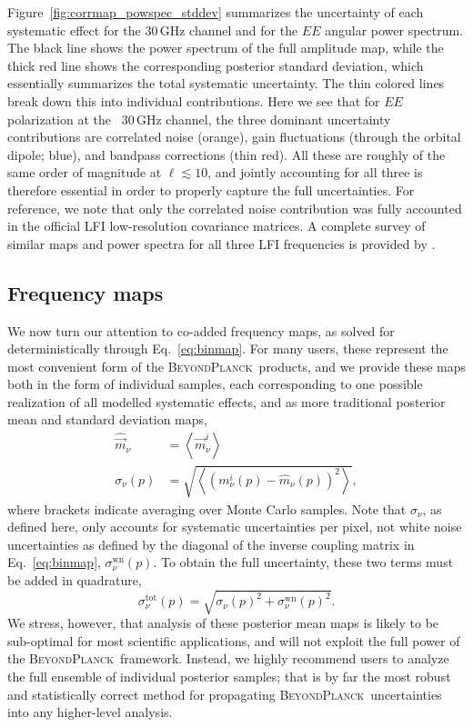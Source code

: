 \documentclass[onecolumn]{aa}
\newcommand{\m}[0]{\vec{m}}
\newcommand{\BP}{\textsc{BeyondPlanck}}
\begin{document}
Figure~\ref{fig:corrmap_powspec_stddev} summarizes the uncertainty of
each systematic effect for the 30\,GHz channel and for the $EE$
angular power spectrum. The black line shows the power spectrum of the
full amplitude map, while the thick red line shows the corresponding
posterior standard deviation, which essentially summarizes the total
systematic uncertainty. The thin colored lines break down this into
individual contributions. Here we see that for $EE$ polarization at
the \Planck\ 30\,GHz channel, the three dominant uncertainty
contributions are correlated noise (orange), gain fluctuations
(through the orbital dipole; blue), and bandpass corrections (thin
red). All these are roughly of the same order of magnitude at
$\ell\lesssim10$, and jointly accounting for all three is therefore
essential in order to properly capture the full uncertainties. For
reference, we note that only the correlated noise contribution was
fully accounted in the official LFI low-resolution covariance
matrices. A complete survey of similar maps and power spectra for all
three LFI frequencies is provided by \citet{bp10}.

\subsection{Frequency maps}
\label{sec:freqmaps}


We now turn our attention to co-added frequency maps, as solved for
deterministically through Eq.~\eqref{eq:binmap}. For many users, these
represent the most convenient form of the \BP\ products, and we
provide these maps both in the form of individual samples, each
corresponding to one possible realization of all modelled systematic
effects, and as more traditional posterior mean and standard deviation
maps,
\begin{align}
  \hat{\m}_{\nu} &= \left<\m_{\nu}^i \right>\\
  \sigma_{\nu}(p) &= \sqrt{\left<\left(m_{\nu}^i(p)-\hat{m}_{\nu}(p)\right)^2 \right>},
\end{align}
where brackets indicate averaging over Monte Carlo samples. Note that
$\sigma_{\nu}$, as defined here, only accounts for systematic uncertainties
per pixel, not white noise uncertainties as defined by the diagonal of
the inverse coupling matrix in Eq.~\eqref{eq:binmap},
$\sigma_{\nu}^{\mathrm{wn}}(p)$. To obtain the full uncertainty, these
two terms must be added in quadrature,
\begin{equation}
  \sigma_{\nu}^{\mathrm{tot}}(p) = \sqrt{\sigma_{\nu}(p)^2 + \sigma_{\nu}^{\mathrm{wn}}(p)^2}.
\end{equation}
We stress, however, that analysis of these posterior mean maps is
likely to be sub-optimal for most scientific applications, and will
not exploit the full power of the \BP\ framework. Instead, we highly
recommend users to analyze the full ensemble of individual posterior
samples; that is by far the most robust and statistically correct
method for propagating \BP\ uncertainties into any higher-level
analysis.
\end{document}
